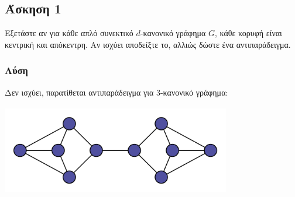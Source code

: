 \subsection*{Άσκηση 1}

Εξετάστε αν για κάθε απλό συνεκτικό $d$-κανονικό γράφημα $G$, κάθε κορυφή είναι κεντρική
και απόκεντρη. Αν ισχύει αποδείξτε το, αλλιώς δώστε ένα αντιπαράδειγμα.

\subsubsection*{Λύση}

Δεν ισχύει, παρατίθεται αντιπαράδειγμα για 3-κανονικό γράφημα:

\begin{center}
\includegraphics[height=4cm, width=10cm]{exercise1/diagrams/d1.png}
\end{center}

